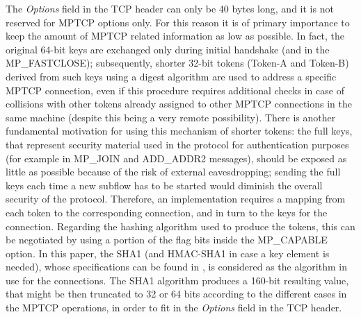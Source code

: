 The \textit{Options} field in the TCP header can only be 40 bytes long, and it is not reserved for MPTCP options only. For this reason it is of primary importance to keep the amount of MPTCP related information as low as possible. In fact, the original 64-bit keys are exchanged only during initial handshake (and in the MP\_FASTCLOSE); subsequently, shorter 32-bit tokens (Token-A and Token-B) derived from such keys using a digest algorithm are used to address a specific MPTCP connection, even if this procedure requires additional checks in case of collisions with other tokens already assigned to other MPTCP connections in the same machine (despite this being a very remote possibility). There is another fundamental motivation for using this mechanism of shorter tokens: the full keys, that represent security material used in the protocol for authentication purposes (for example in MP\_JOIN and ADD\_ADDR2 messages), should be exposed as little as possible because of the risk of external eavesdropping; sending the full keys each time a new subflow has to be started would diminish the overall security of the protocol. Therefore, an implementation requires a mapping from each token to the corresponding connection, and in turn to the keys for the connection.
Regarding the hashing algorithm used to produce the tokens, this can be negotiated by using a portion of the flag bits inside the MP\_CAPABLE option. In this paper, the SHA1 (and HMAC-SHA1 in case a key element is needed), whose specifications can be found in , is considered as the algorithm in use for the connections. The SHA1 algorithm produces a 160-bit resulting value, that might be then truncated to 32 or 64 bits according to the different cases in the MPTCP operations, in order to fit in the \textit{Options} field in the TCP header.


